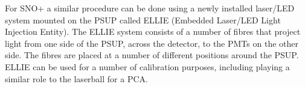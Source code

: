 For SNO+ a similar procedure can be done using a newly installed laser/LED system
mounted on the PSUP called ELLIE (Embedded Laser/LED Light Injection Entity).
The ELLIE system consists of a number of fibres that project light from one
side of the PSUP, across the detector, to the PMTs on the other side.
The fibres are placed at a number of different positions around the PSUP.
ELLIE can be used for a number of calibration purposes, including playing a
similar role to the laserball for a PCA.
